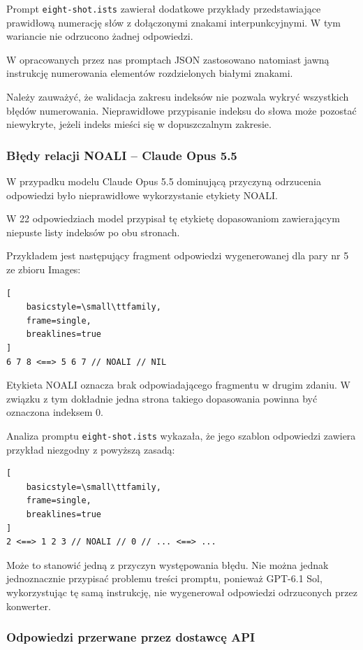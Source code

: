 \documentclass[a4paper,10pt]{article}
\begin{document}
Prompt \texttt{eight-shot.ists} zawierał dodatkowe
przykłady przedstawiające prawidłową numerację słów
z dołączonymi znakami interpunkcyjnymi. W tym
wariancie nie odrzucono żadnej odpowiedzi.

W opracowanych przez nas promptach JSON zastosowano
natomiast jawną instrukcję numerowania elementów
rozdzielonych białymi znakami.

Należy zauważyć, że walidacja zakresu indeksów nie
pozwala wykryć wszystkich błędów numerowania.
Nieprawidłowe przypisanie indeksu do słowa może
pozostać niewykryte, jeżeli indeks mieści się
w dopuszczalnym zakresie.


\subsubsection{Błędy relacji NOALI -- Claude Opus 5.5}

W przypadku modelu Claude Opus 5.5 dominującą przyczyną
odrzucenia odpowiedzi było nieprawidłowe wykorzystanie
etykiety NOALI.

W 22 odpowiedziach model przypisał tę etykietę
dopasowaniom zawierającym niepuste listy indeksów
po obu stronach.

Przykładem jest następujący fragment odpowiedzi
wygenerowanej dla pary nr 5 ze zbioru Images:

\begin{lstlisting}[
    basicstyle=\small\ttfamily,
    frame=single,
    breaklines=true
]
6 7 8 <==> 5 6 7 // NOALI // NIL
\end{lstlisting}

Etykieta NOALI oznacza brak odpowiadającego fragmentu
w drugim zdaniu. W związku z tym dokładnie jedna
strona takiego dopasowania powinna być oznaczona
indeksem 0.

Analiza promptu \texttt{eight-shot.ists} wykazała,
że jego szablon odpowiedzi zawiera przykład
niezgodny z powyższą zasadą:

\begin{lstlisting}[
    basicstyle=\small\ttfamily,
    frame=single,
    breaklines=true
]
2 <==> 1 2 3 // NOALI // 0 // ... <==> ...
\end{lstlisting}

Może to stanowić jedną z przyczyn występowania błędu.
Nie można jednak jednoznacznie przypisać problemu
treści promptu, ponieważ GPT-6.1 Sol, wykorzystując
tę samą instrukcję, nie wygenerował odpowiedzi
odrzuconych przez konwerter.


\subsubsection{Odpowiedzi przerwane przez dostawcę API}
\end{document}
